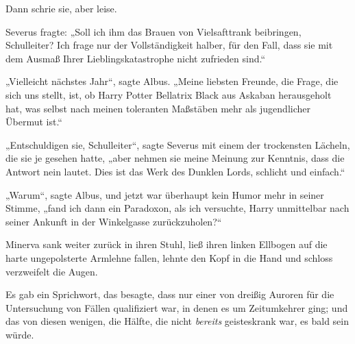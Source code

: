 Dann schrie sie, aber leise.

Severus fragte:
„Soll ich ihm das Brauen von Vielsafttrank beibringen, Schulleiter? Ich frage nur der Vollständigkeit halber, für den Fall, dass sie mit dem Ausmaß Ihrer Lieblingskatastrophe nicht zufrieden sind.“

„Vielleicht nächstes Jahr“, sagte Albus.
„Meine liebsten Freunde, die Frage, die sich uns stellt, ist, ob Harry Potter Bellatrix Black aus Askaban herausgeholt hat, was selbst nach meinen toleranten Maßstäben mehr als jugendlicher Übermut ist.“

„Entschuldigen sie, Schulleiter“, sagte Severus mit einem der trockensten Lächeln, die sie je gesehen hatte, „aber nehmen sie meine Meinung zur Kenntnis, dass die Antwort nein lautet. Dies ist das Werk des Dunklen Lords, schlicht und einfach.“

„Warum“, sagte Albus, und jetzt war überhaupt kein Humor mehr in seiner Stimme, „fand ich dann ein Paradoxon, als ich versuchte, Harry unmittelbar nach seiner Ankunft in der Winkelgasse zurückzuholen?“

Minerva sank weiter zurück in ihren Stuhl, ließ ihren linken Ellbogen auf die harte ungepolsterte Armlehne fallen, lehnte den Kopf in die Hand und schloss verzweifelt die Augen.

Es gab ein Sprichwort, das besagte, dass nur einer von dreißig Auroren für die Untersuchung von Fällen qualifiziert war, in denen es um Zeitumkehrer ging; und das von diesen wenigen, die Hälfte, die nicht \emph{bereits} geisteskrank war, es bald sein würde.

